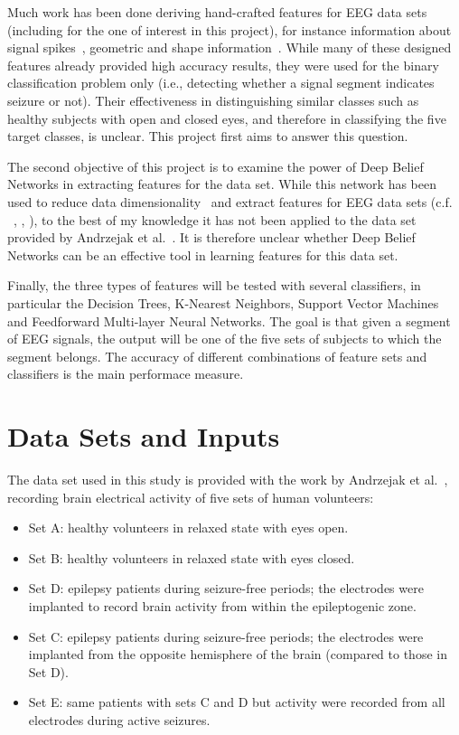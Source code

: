 \documentclass[12pt]{article}
\begin{document}
Much work has been done deriving hand-crafted features for EEG data sets (including for the one of interest in this project), for instance information about signal spikes~\cite{nigam2004neural}, geometric and shape information~\cite{wulsin2011modeling}. While many of these designed features already provided high accuracy results, they were used for the binary classification problem only (i.e., detecting whether a signal segment indicates seizure or not). Their effectiveness in distinguishing similar classes such as healthy subjects with open and closed eyes, and therefore in classifying the five target classes, is unclear. This project first aims to answer this question.

The second objective of this project is to examine the power of Deep Belief Networks in extracting features for the data set. While this network has been used to reduce data dimensionality~\cite{hinton2006reducing} and extract features for EEG data sets (c.f. ~\cite{langkvist2012sleep}, \cite{wang2013modeling}, \cite{wulsin2011modeling}), to the best of my knowledge it has not been applied to the data set provided by Andrzejak et al.~\cite{andrzejak2001indications}. It is therefore unclear whether Deep Belief Networks can be an effective tool in learning features for this data set.

Finally, the three types of features will be tested with several classifiers, in particular the Decision Trees, K-Nearest Neighbors, Support Vector Machines and Feedforward Multi-layer Neural Networks. The goal is that given a segment of EEG signals, the output will be one of the five sets of subjects to which the segment belongs. The accuracy of different combinations of feature sets and classifiers is the main performace measure.

\section{Data Sets and Inputs}

The data set used in this study is provided with the work by Andrzejak et al.~\cite{andrzejak2001indications}, recording brain electrical activity of five sets of human volunteers:
\begin{itemize}
\item Set A: healthy volunteers in relaxed state with eyes open.
\item Set B: healthy volunteers in relaxed state with eyes closed.
\item Set D: epilepsy patients during seizure-free periods; the electrodes were implanted to record brain activity from within the epileptogenic zone.
\item Set C: epilepsy patients during seizure-free periods; the electrodes were implanted from the opposite hemisphere of the brain (compared to those in Set D).
\item Set E: same patients with sets C and D but activity were recorded from all electrodes during active seizures.
\end{itemize}
\end{document}
